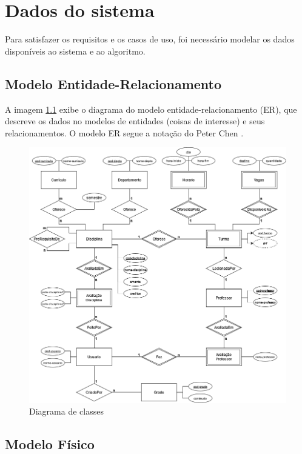 \chapter{Dados do sistema}
\label{cha:Dados do sistema}

Para satisfazer os requisitos e os casos de uso, foi necessário modelar os dados disponíveis ao sistema e ao algoritmo.

\section{Modelo Entidade-Relacionamento}

A imagem \ref{fig:diagrama-classes} exibe o diagrama do modelo entidade-relacionamento (ER), que descreve os dados no modelos de entidades (coisas de interesse) e seus relacionamentos. O modelo ER segue a notação do Peter Chen \cite{peter-chen}. 

\begin{figure}[ht]
    \begin{center}
    \includegraphics[width=390pt]{figuras/diagrama-er-chen-pdf.png}
    \caption{Diagrama de classes}
    \label{fig:diagrama-classes}
    \end{center}
\end{figure}

\section{Modelo Físico}


